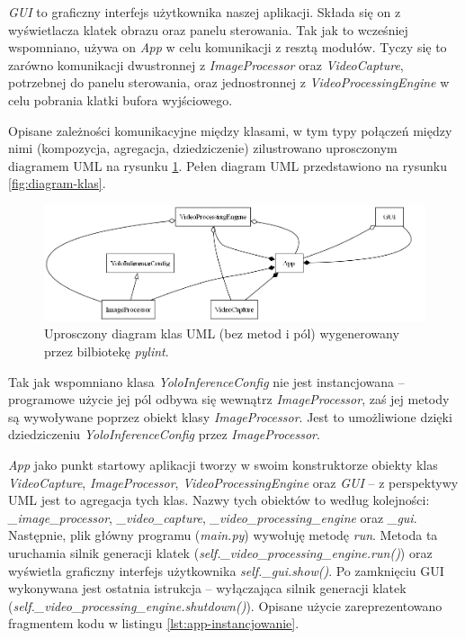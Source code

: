 \emph{GUI} to graficzny interfejs użytkownika naszej aplikacji. Składa się on z wyświetlacza klatek obrazu oraz panelu sterowania. Tak jak to wcześniej wspomniano, używa on \emph{App} w celu komunikacji z resztą modułów. Tyczy się to zarówno komunikacji dwustronnej z \emph{ImageProcessor} oraz \emph{VideoCapture}, potrzebnej do panelu sterowania, oraz jednostronnej z \emph{VideoProcessingEngine} w celu pobrania klatki bufora wyjściowego.  

Opisane zależności komunikacyjne między klasami, w tym typy połączeń między nimi (kompozycja, agregacja, dziedziczenie) zilustrowano uprosczonym diagramem UML na rysunku \ref{fig:uprosczony-diagram-klas}. Pełen diagram UML przedstawiono na rysunku \ref{fig:diagram-klas}. 

\begin{figure}[H]
    \centering
    \includegraphics[width=\linewidth]{r_implementacja/klasy/simplified_classes.png}
    \caption{Uprosczony diagram klas UML (bez metod i pól) wygenerowany przez bilbiotekę \emph{pylint}.}
    \label{fig:uprosczony-diagram-klas}
\end{figure}

Tak jak wspomniano klasa \emph{YoloInferenceConfig} nie jest instancjowana -- programowe użycie jej pól odbywa się wewnątrz \emph{ImageProcessor}, zaś jej metody są wywoływane poprzez obiekt klasy \emph{ImageProcessor}. Jest to umożliwione dzięki dziedziczeniu \emph{YoloInferenceConfig} przez \emph{ImageProcessor}.

\emph{App} jako punkt startowy aplikacji tworzy w swoim konstruktorze obiekty klas \emph{VideoCapture}, \emph{ImageProcessor}, \emph{VideoProcessingEngine} oraz \emph{GUI} -- z perspektywy UML jest to agregacja tych klas. Nazwy tych obiektów to według kolejności: \emph{\_image\_processor}, \emph{\_video\_capture}, \emph{\_video\_processing\_engine} oraz \emph{\_gui}. Następnie, plik główny programu (\emph{main.py}) wywołuję metodę \emph{run}. Metoda ta uruchamia silnik generacji klatek (\emph{self.\_video\_processing\_engine.run()}) oraz wyświetla graficzny interfejs użytkownika \emph{self.\_gui.show()}. Po zamknięciu GUI wykonywana jest ostatnia istrukcja -- wyłączająca silnik generacji klatek (\emph{self.\_video\_processing\_engine.shutdown()}). Opisane użycie zareprezentowano fragmentem kodu w listingu \ref{lst:app-instancjowanie}.

